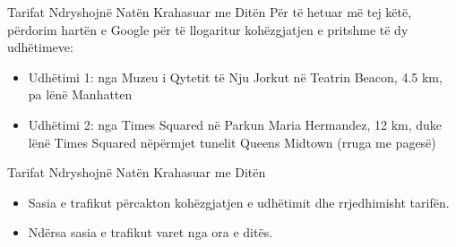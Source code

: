 \documentclass[
  ignorenonframetext,
]{beamer}
\begin{document}
\begin{frame}{Tarifat Ndryshojnë Natën Krahasuar me Ditën}
\protect\hypertarget{tarifat-ndryshojnuxeb-natuxebn-krahasuar-me-dituxebn-14}{}
Për të hetuar më tej këtë, përdorim hartën e Google për të llogaritur
kohëzgjatjen e pritshme të dy udhëtimeve:

\begin{itemize}
\item
  Udhëtimi 1: nga Muzeu i Qytetit të Nju Jorkut në Teatrin Beacon, 4.5
  km, pa lënë Manhatten
\item
  Udhëtimi 2: nga Times Squared në Parkun Maria Hermandez, 12 km, duke
  lënë Times Squared nëpërmjet tunelit Queens Midtown (rruga me pagesë)
\end{itemize}
\end{frame}

\begin{frame}{Tarifat Ndryshojnë Natën Krahasuar me Ditën}
\protect\hypertarget{tarifat-ndryshojnuxeb-natuxebn-krahasuar-me-dituxebn-15}{}
\begin{itemize}
\item
  Sasia e trafikut përcakton kohëzgjatjen e udhëtimit dhe rrjedhimisht
  tarifën.
\item
  Ndërsa sasia e trafikut varet nga ora e ditës.
\end{itemize}
\end{frame}
\end{document}
